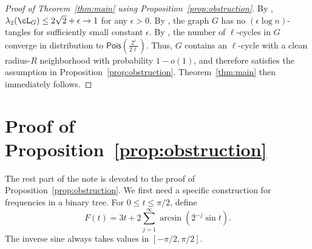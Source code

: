 \documentclass[11pt,reqno]{amsart}
\begin{document}
\begin{proof}[Proof of Theorem~\ref{thm:main} using Proposition~\ref{prop:obstruction}]
    By \cite{friedman2008proof, bordenave2015new}, $\lambda_2(\cL_G) \le 2\sqrt{2}+\epsilon \to 1$ for any $\epsilon>0$. By \cite{friedman2008proof}, the graph $G$ has no $(\epsilon \log n)$-tangles for sufficiently small constant $\epsilon$. By \cite{mckay2004short}, the number of $\ell$-cycles in $G$ converge in distribution to $\mathsf{Pois}(\frac{2^\ell}{2\ell})$. Thus, $G$ contains an $\ell$-cycle with a clean radius-$R$ neighborhood with probability $1-o(1)$, and therefore satisfies the assumption in Proposition~\ref{prop:obstruction}. Theorem~\ref{thm:main} then immediately follows.
\end{proof}

\section{Proof of Proposition~\ref{prop:obstruction}}

The rest part of the note is devoted to the proof of Proposition~\ref{prop:obstruction}. We first need a specific construction for frequencies in a binary tree. For $0\le t\le\pi/2$, define
\[
    F(t)=3t+2\sum_{j=1}^{\infty}\arcsin(2^{-j}\sin t).
\]
The inverse sine always takes values in $[-\pi/2,\pi/2]$.
\end{document}
